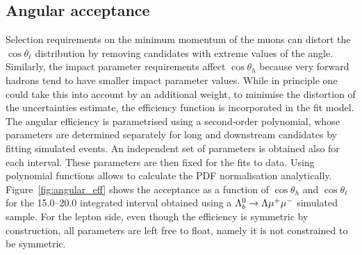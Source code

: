

\subsection{Angular acceptance}
\label{sec:AngEff}

Selection requirements on the minimum momentum of the muons can distort the $\cos\theta_\ell$ 
distribution by removing candidates with extreme values of the angle. Similarly, 
the impact parameter requirements affect $\cos\theta_h$ because very forward hadrons tend
to have smaller impact parameter values. While in principle one could take this into account
by an additional weight, to minimise the distortion of the uncertainties estimate,
the efficiency function is incorporated in the fit model. The angular efficiency is
parametrised using a second-order polynomial, whose parameters are determined separately for long 
and downstream candidates by fitting simulated events. An independent set of parameters is obtained
also for each \qsq interval. These parameters are then fixed for the fits to data.
Using polynomial functions allows to calculate the PDF normalisation analytically.
Figure~\ref{fig:angular_eff} shows the acceptance as a function of $\cos\theta_h$ and 
$\cos\theta_\ell$ for the 15.0--20.0 integrated \qsq interval obtained using a $\Lambda^0_b\rightarrow\Lambda\mu^+\mu^-$ simulated sample.
%
For the lepton side, even though the efficiency is symmetric by construction,
all parameters are left free to float, namely it is not constrained to be symmetric.

